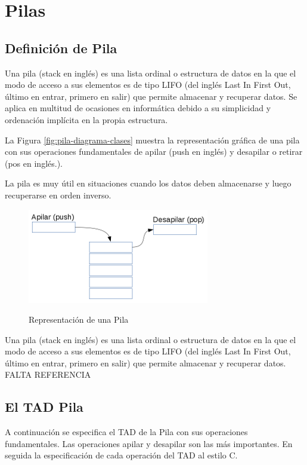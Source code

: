 \chapter{Pilas}

\section{Definición de Pila}
Una pila (stack en inglés) es una lista ordinal o estructura de datos en la que el modo de acceso a sus elementos es de tipo LIFO (del inglés Last In First Out, último en entrar, primero en salir) que permite almacenar y recuperar datos. Se aplica en multitud de ocasiones en informática debido a su simplicidad y ordenación implícita en la propia estructura. 

La Figura  \ref{fig:pila-diagrama-clases} muestra la representación gráfica de una pila con sus operaciones fundamentales de apilar (push en inglés) y desapilar o retirar (pos en inglés.).

La pila es muy útil en situaciones cuando los datos deben almacenarse y luego recuperarse en orden inverso.

\begin{figure}
	\centering\textbf{}
		\includegraphics{images/RepresentacionPila}
	\caption{Representación de una Pila}	
	\label{fig:pila-representacion}
\end{figure}

\begin{definicion}
Una pila (stack en inglés) es una lista ordinal o estructura de datos en la que el modo de acceso a sus elementos es de tipo LIFO (del inglés Last In First Out, último en entrar, primero en salir) que permite almacenar y recuperar datos. FALTA REFERENCIA
\end{definicion}

\section{El TAD Pila}
A continuación se especifica el TAD de la Pila con sus operaciones fundamentales. Las operaciones apilar y desapilar son las más importantes. En seguida la especificación de cada operación del TAD al estilo C.

